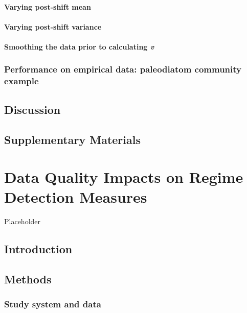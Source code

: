 \documentclass[12pt,twoside,openany]{reedthesis}
\begin{document}
\subsubsection{Varying post-shift mean}\label{varying-post-shift-mean}

\subsubsection{Varying post-shift
variance}\label{varying-post-shift-variance}

\subsubsection{\texorpdfstring{Smoothing the data prior to calculating
\emph{v}}{Smoothing the data prior to calculating v}}\label{smoothing-the-data-prior-to-calculating-v}

\subsection{Performance on empirical data: paleodiatom community
example}\label{performance-on-empirical-data-paleodiatom-community-example}

\section{Discussion}\label{discussion-2}

\section{Supplementary Materials}\label{supplementary-materials}

\chapter{Data Quality Impacts on Regime Detection
Measures}\label{resampling}

Placeholder

\section{Introduction}\label{introduction-4}

\section{Methods}\label{methods-1}

\subsection{Study system and data}\label{study-system-and-data}
\end{document}
